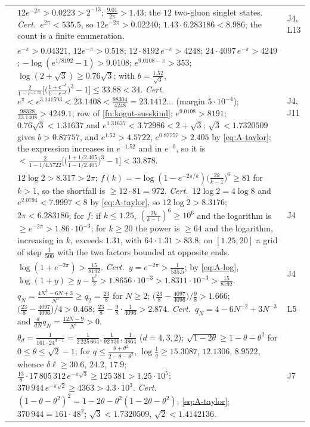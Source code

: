 \documentclass[11pt,a4paper]{amsart}
\theoremstyle{definition}
\theoremstyle{remark}
\numberwithin{equation}{section}
\begin{document}
{\begin{longtable}{@{}p{}p{}p{}@{}}
{prop:no-stefan-boltzmann} & $12e^{-2\pi}>0.0223>2^{-13}$; $\frac{9.01}{2\pi}>1.43$; the $12$ two-gluon singlet states. \emph{Cert.}\ $e^{2\pi}<535.5$, so $12e^{-2\pi}>0.02240$; $1.43\cdot6.283186<8.986$; the count is a finite enumeration. & J4, L13\\
{thm:free-gluon} & $e^{-\pi}>0.04321$, $12e^{-\pi}>0.518$; $12\cdot8192\,e^{-\pi}>4248$; $24\cdot4097\,e^{-\pi}>4249$; $-\log(e^{1/8192}-1)>9.0108$; $e^{9.0108-\pi}>353$; $\log(2+\sqrt3)\ge0.76\sqrt3$; with $b=\frac{1.52}{\sqrt3}$, $\frac{2}{1-e^{-1.52}}\bigl[\bigl(\frac{1+e^{-b}}{1-e^{-b}}\bigr)^3-1\bigr]\le33.88<34$. \emph{Cert.}\ $e^{\pi}<e^{3.141593}<23.1408<\frac{98304}{4248}=23.1412\ldots$ (margin $5\cdot10^{-4}$); $\frac{98328}{23.1408}>4249.1$; row of \cref{fn:kogut-susskind}; $e^{9.0108}>8191$; $0.76\sqrt3<1.31637$ and $e^{1.31637}<3.72986<2+\sqrt3$; $\sqrt3<1.7320509$ gives $b>0.87757$, and $e^{1.52}>4.5722$, $e^{0.87757}>2.405$ by \eqref{eq:A-taylor}; the expression increases in $e^{-1.52}$ and in $e^{-b}$, so it is $<\frac{2}{1-1/4.5722}\bigl[\bigl(\frac{1+1/2.405}{1-1/2.405}\bigr)^3-1\bigr]<33.878$. & J4, J11\\
{thm:free-gluon} & $12\log2>8.317>2\pi$; $f(k)=-\log(1-e^{-2\pi/k})\bigl(\frac{2k}{k-1}\bigr)^6\ge81$ for $k>1$, so the shortfall is $\ge12\cdot81=972$. \emph{Cert.}\ $12\log2=4\log8$ and $e^{2.0794}<7.9997<8$ by \eqref{eq:A-taylor}, so $12\log2>8.3176$; $2\pi<6.283186$; for $f$: if $k\le1.25$, $(\frac{2k}{k-1})^6\ge10^6$ and the logarithm is $\ge e^{-2\pi}>1.86\cdot10^{-3}$; for $k\ge20$ the power is $\ge64$ and the logarithm, increasing in $k$, exceeds $1.31$, with $64\cdot1.31>83.8$; on $[1.25,20]$ a grid of step $\frac1{500}$ with the two factors bounded at opposite ends. & J4\\
{thm:pair} & $\log(1+e^{-2\pi})>\frac{15}{8192}$. \emph{Cert.}\ $y=e^{-2\pi}>\frac1{535.5}$; by \eqref{eq:A-log}, $\log(1+y)\ge y-\frac{y^2}2>1.8656\cdot10^{-3}>1.8311\cdot10^{-3}>\frac{15}{8192}$. & J4\\
{thm:exclusivity} & $q_N=\frac{4N^3-6N+3}{N^3}\ge q_2=\frac{23}8$ for $N\ge2$; $\bigl(\frac{23}8-\frac{4097}{4096}\bigr)/\frac98>1.666$; $\bigl(\frac{23}8-\frac{4097}{4096}\bigr)/4>0.468$; $\frac{23}8-\frac98\cdot\frac1{4096}>2.874$. \emph{Cert.}\ $q_N=4-6N^{-2}+3N^{-3}$ and $\frac{d}{dN}q_N=\frac{12N-9}{N^4}>0$. & L5\\
{prop:finite-volume-gap} & $\theta_d=\frac1{161\cdot24^{d-1}}=\frac1{2\,225\,664},\frac1{92\,736},\frac1{3864}$ ($d=4,3,2$); $\sqrt{1-2\theta}\ge1-\theta-\theta^2$ for $0\le\theta\le\sqrt2-1$; for $q\le\frac{\theta+\theta^2}{2-\theta-\theta^2}$, $\log\frac1q\ge15.3087$, $12.1306$, $8.9522$, whence $\delta\ell\ge30.6$, $24.2$, $17.9$; $\frac{13}8\cdot17\,805\,312\,e^{-\pi\sqrt3}\ge125\,381>1.25\cdot10^5$; $370\,944\,e^{-\pi\sqrt2}\ge4363>4.3\cdot10^3$. \emph{Cert.}\ $(1-\theta-\theta^2)^2=1-2\theta-\theta^2(1-2\theta-\theta^2)$; \eqref{eq:A-taylor}; $370\,944=161\cdot48^2$; $\sqrt3<1.7320509$, $\sqrt2<1.4142136$. & J7\\

\end{longtable}}
\end{document}
